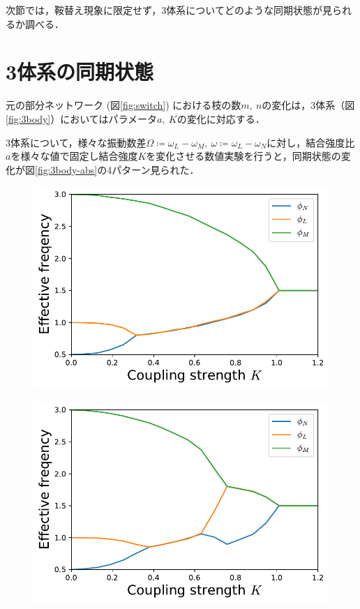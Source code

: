 \documentclass[../main]{subfiles}
\begin{document}
次節では，鞍替え現象に限定せず，3体系についてどのような同期状態が見られるか調べる．
\section{3体系の同期状態}
\label{sec:3body-synchro-state}
元の部分ネットワーク (図\ref{fig:switch}) における枝の数$m,\ n$の変化は，3体系（図\ref{fig:3body}）においてはパラメータ$a,\ K$の変化に対応する．

3体系について，様々な振動数差$\Omega\coloneqq\omega_L-\omega_M,\ \omega\coloneqq\omega_L-\omega_N$に対し，結合強度比$a$を様々な値で固定し結合強度$K$を変化させる数値実験を行うと，同期状態の変化が図\ref{fig:3body-abs}の4パターン見られた．

\captionsetup[figure]{justification=centering}
\begin{figure}[tbp]
    \begin{minipage}[b]{0.47\linewidth}
        \centering
        \includegraphics[keepaspectratio, scale=0.42]{images/three-body-prob-notapprox-a150.pdf}
        \label{fig:3body-notapprox150}
    \end{minipage}
    \begin{minipage}[b]{0.47\linewidth}
      \centering
      \includegraphics[keepaspectratio, scale=0.42]{images/three-body-prob-notapprox-a175.pdf}

\end{minipage}
\end{figure}
\end{document}
